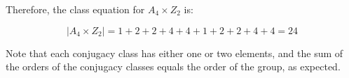 \documentclass[12pt]{report}
\begin{document}
Therefore, the class equation for $A_4 \times Z_2$ is:

$$|A_4 \times Z_2| = 1 + 2 + 2 + 4 + 4 + 1 + 2 + 2 + 4 + 4 = 24$$

Note that each conjugacy class has either one or two elements, and the sum of the orders of the conjugacy classes equals the order of the group, as expected.

\sol

\sol

\sol
\end{document}

